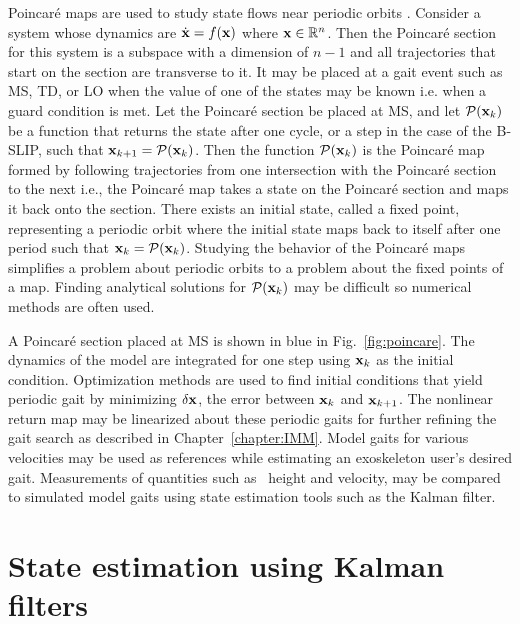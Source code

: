 Poincar\'e maps are used to study state flows near periodic orbits \cite{strogatz2018nonlinear}. Consider a system whose dynamics are $ \dot{\mathbf{x}} = f(\mathbf{x}) $ where $ \mathbf{x} \in \mathbb{R}^n $. Then the  Poincar\'e section for this system is a subspace with a dimension of $ n-1 $ and all trajectories that start on the section are transverse to it. It may be placed at a gait event such as MS, TD, or LO when the value of one of the states may be known i.e. when a guard condition is met. Let the Poincar\'e section be placed at MS, and let $ \mathcal{P}(\mathbf{x}_k) $ be a function that returns the state after one cycle, or a step in the case of the B-SLIP, such that $ \mathbf{x}_{k+1} = \mathcal{P}(\mathbf{x}_k) $. Then the function $ \mathcal{P}(\mathbf{x}_k) $ is the Poincar\'e map formed by following trajectories from one intersection with the Poincar\'e section to the next i.e., the Poincar\'e map takes a state on the Poincar\'e section and maps it back onto the section. There exists an initial state, called a fixed point, representing a periodic orbit where the initial state maps back to itself after one period such that $ \mathbf{x}_k = \mathcal{P}(\mathbf{x}_k) $. Studying the behavior of the Poincar\'e maps simplifies a problem about periodic orbits to a problem about the fixed points of a map. Finding analytical solutions for $ \mathcal{P}(\mathbf{x}_k) $ may be difficult so numerical methods are often used. 
%
%

A Poincar\'e section placed at MS is shown in blue in Fig.~\ref{fig:poincare}. The dynamics of the model are integrated for one step using $ \mathbf{x}_k $ as the initial condition. Optimization methods are used to find initial conditions that yield periodic gait by minimizing $ \delta \mathbf{x} $, the error between $ \mathbf{x}_k $ and $ \mathbf{x}_{k+1} $. The nonlinear return map may be linearized about these periodic gaits for further refining the gait search as described in Chapter~\ref{chapter:IMM}. Model gaits for various velocities may be used as references while estimating an exoskeleton user's desired gait. Measurements of quantities such as \COM~height and velocity, may be compared to simulated model gaits using state estimation tools such as the Kalman filter. 

\section{State estimation using Kalman filters}

